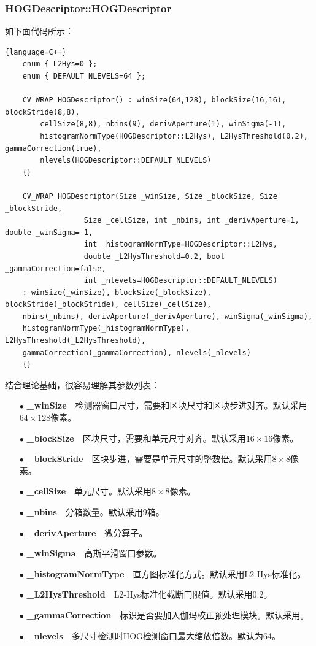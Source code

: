 \documentclass[10pt,technote,onecolumn,twoside]{IEEEtran}
\begin{document}
\subsubsection{HOGDescriptor::HOGDescriptor}
如下面代码所示：
\begin{lstlisting}{language=C++}
	enum { L2Hys=0 };
    enum { DEFAULT_NLEVELS=64 };

    CV_WRAP HOGDescriptor() : winSize(64,128), blockSize(16,16), blockStride(8,8),
        cellSize(8,8), nbins(9), derivAperture(1), winSigma(-1),
        histogramNormType(HOGDescriptor::L2Hys), L2HysThreshold(0.2), gammaCorrection(true),
        nlevels(HOGDescriptor::DEFAULT_NLEVELS)
    {}

    CV_WRAP HOGDescriptor(Size _winSize, Size _blockSize, Size _blockStride,
                  Size _cellSize, int _nbins, int _derivAperture=1, double _winSigma=-1,
                  int _histogramNormType=HOGDescriptor::L2Hys,
                  double _L2HysThreshold=0.2, bool _gammaCorrection=false,
                  int _nlevels=HOGDescriptor::DEFAULT_NLEVELS)
    : winSize(_winSize), blockSize(_blockSize), blockStride(_blockStride), cellSize(_cellSize),
    nbins(_nbins), derivAperture(_derivAperture), winSigma(_winSigma),
    histogramNormType(_histogramNormType), L2HysThreshold(_L2HysThreshold),
    gammaCorrection(_gammaCorrection), nlevels(_nlevels)
    {}
\end{lstlisting}
结合理论基础，很容易理解其参数列表：
\begin{enumerate}
\item[$\bullet$]\textbf{\_winSize}~~检测器窗口尺寸，需要和区块尺寸和区块步进对齐。默认采用$64\times128$像素。
\item[$\bullet$]\textbf{\_blockSize}~~区块尺寸，需要和单元尺寸对齐。默认采用$16\times16$像素。
\item[$\bullet$]\textbf{\_blockStride}~~区块步进，需要是单元尺寸的整数倍。默认采用$8\times8$像素。
\item[$\bullet$]\textbf{\_cellSize}~~单元尺寸。默认采用$8\times8$像素。
\item[$\bullet$]\textbf{\_nbins}~~分箱数量。默认采用9箱。
\item[$\bullet$]\textbf{\_derivAperture}~~微分算子。
\item[$\bullet$]\textbf{\_winSigma}~~高斯平滑窗口参数。
\item[$\bullet$]\textbf{\_histogramNormType}~~直方图标准化方式。默认采用L2-Hys标准化\cite{bib5}。
\item[$\bullet$]\textbf{\_L2HysThreshold}~~L2-Hys标准化截断门限值。默认采用0.2。
\item[$\bullet$]\textbf{\_gammaCorrection}~~标识是否要加入伽玛校正预处理模块。默认采用。
\item[$\bullet$]\textbf{\_nlevels}~~多尺寸检测时HOG检测窗口最大缩放倍数。默认为64。
\end{enumerate}
\end{document}
